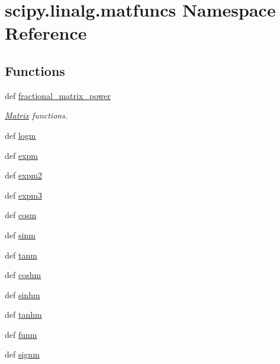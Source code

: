 \hypertarget{namespacescipy_1_1linalg_1_1matfuncs}{}\section{scipy.\+linalg.\+matfuncs Namespace Reference}
\label{namespacescipy_1_1linalg_1_1matfuncs}
\subsection*{Functions}
\begin{DoxyCompactItemize}
\item 
def \hyperlink{namespacescipy_1_1linalg_1_1matfuncs_a378c56928cc4f9761a6e873ca5ccea46}{fractional\+\_\+matrix\+\_\+power}
\begin{DoxyCompactList}\small\item\em \hyperlink{classMatrix}{Matrix} functions. \end{DoxyCompactList}\item 
def \hyperlink{namespacescipy_1_1linalg_1_1matfuncs_abe2d732c9f27031d9dfb69a8fda6556c}{logm}
\item 
def \hyperlink{namespacescipy_1_1linalg_1_1matfuncs_a09814bef566e2a9d523902b99ad52ec8}{expm}
\item 
def \hyperlink{namespacescipy_1_1linalg_1_1matfuncs_a9bca5260041253067de39b7a01d6e0b6}{expm2}
\item 
def \hyperlink{namespacescipy_1_1linalg_1_1matfuncs_a4c878cb0df81b4d90b31a13c431725f8}{expm3}
\item 
def \hyperlink{namespacescipy_1_1linalg_1_1matfuncs_a35cccdd5c1f6b03cd39e9b9b16e54d69}{cosm}
\item 
def \hyperlink{namespacescipy_1_1linalg_1_1matfuncs_ad63817459aac7bd45abeea7824424a66}{sinm}
\item 
def \hyperlink{namespacescipy_1_1linalg_1_1matfuncs_af74058d07bcd8a3804ada59d9352cbf0}{tanm}
\item 
def \hyperlink{namespacescipy_1_1linalg_1_1matfuncs_af40a328822f0d63d58e5b95cee9e2bf0}{coshm}
\item 
def \hyperlink{namespacescipy_1_1linalg_1_1matfuncs_a68ee717f80b0e3ccca11d4de1bc86d7c}{sinhm}
\item 
def \hyperlink{namespacescipy_1_1linalg_1_1matfuncs_afad11860c329bb2fa4b14ce4453d6336}{tanhm}
\item 
def \hyperlink{namespacescipy_1_1linalg_1_1matfuncs_a6fc93ae48a4c61907d10c3f97fa7bc7d}{funm}
\item 
def \hyperlink{namespacescipy_1_1linalg_1_1matfuncs_a75ba21a9301d67eae8aa590a73d5e82d}{signm}
\end{DoxyCompactItemize}
